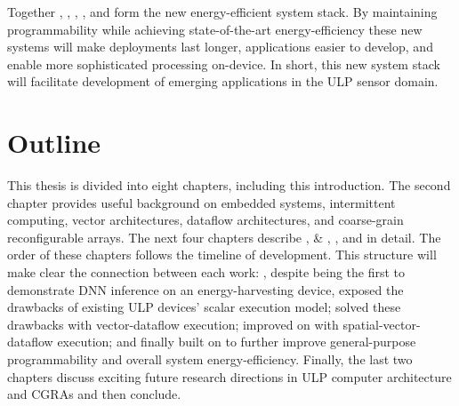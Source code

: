 Together \sonic, \manic, \manicsilicon, \snafu, and \riptide form the new energy-efficient system stack.
% 
By maintaining programmability while achieving state-of-the-art energy-efficiency these new systems will make deployments last longer, applications easier to develop, and enable more sophisticated processing on-device.
% 
In short, this new system stack will facilitate development of emerging applications in the ULP sensor domain.

\section{Outline}
This thesis is divided into eight chapters, including this introduction.
%
The second chapter provides useful background on embedded systems, intermittent computing, vector architectures, dataflow architectures, and coarse-grain reconfigurable arrays.
% 
The next four chapters describe \sonic, \manic \& \manicsilicon, \snafu, and \riptide in detail.
% 
The order of these chapters follows the timeline of development.
% 
This structure will make clear the connection between each work:
% 
\sonic, despite being the first to demonstrate DNN inference on an energy-harvesting device, exposed the drawbacks of existing ULP devices' scalar execution model; \manic solved these drawbacks with vector-dataflow execution; \snafu improved on \manic with spatial-vector-dataflow execution; and finally \riptide built on \snafu to further improve general-purpose programmability and overall system energy-efficiency.
% 
Finally, the last two chapters discuss exciting future research directions in ULP computer architecture and CGRAs and then conclude.
